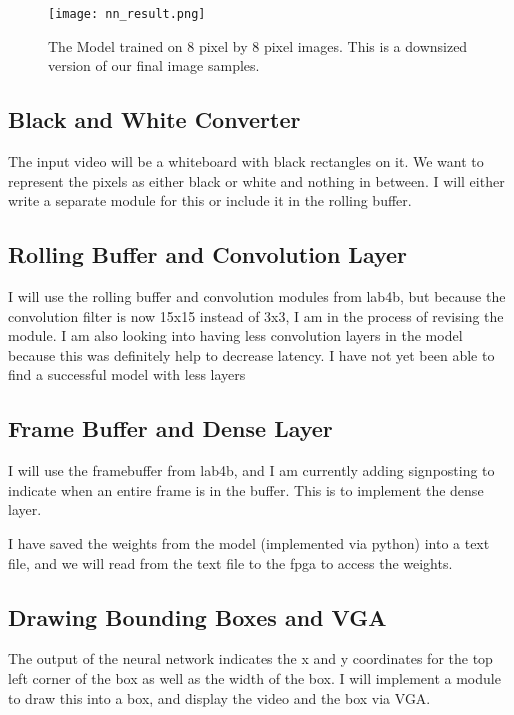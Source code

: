 \begin{figure}[htbp]
\texttt{[image: nn\_result.png]}
\caption{The Model trained on 8 pixel by 8 pixel images. This is a downsized version of our final image samples.}
\label{fig}
\end{figure}


\subsection{Black and White Converter}
The input video will be a whiteboard with black rectangles on it. We want to represent the pixels as either black or white and nothing in between. I will either write a separate module for this or include it in the rolling buffer.

\subsection{Rolling Buffer and Convolution Layer}
I will use the rolling buffer and convolution modules from lab4b, but because the convolution filter is now 15x15 instead of 3x3, I am in the process of revising the module. I am also looking into having less convolution layers in the model because this was definitely help to decrease latency. I have not yet been able to find a successful model with less layers

\subsection{Frame Buffer and Dense Layer}
I will use the framebuffer from lab4b, and I am currently adding signposting to indicate when an entire frame is in the buffer. This is to implement the dense layer.

I have saved the weights from the model (implemented via python) into a text file, and we will read from the text file to the fpga to access the weights.

\subsection{Drawing Bounding Boxes and VGA}
The output of the neural network indicates the x and y coordinates for the top left corner of the box as well as the width of the box. I will implement a module to draw this into a box, and display the video and the box via VGA.




